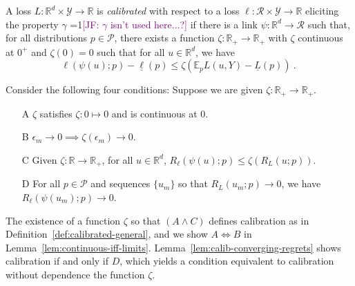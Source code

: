 \documentclass[anon,12pt]{colt2021} %
\newcommand{\Comments}{1}
\newcommand{\mynote}[2]{\ifnum\Comments=1\textcolor{#1}{#2}\fi}
\newcommand{\jessie}[1]{\mynote{purple}{[JF: #1]}}
\newcommand{\reals}{\mathbb{R}}
\newcommand{\E}{\mathbb{E}}
\newcommand{\R}{\mathcal{R}}
\renewcommand{\P}{\mathcal{P}}
\newcommand{\Y}{\mathcal{Y}}
\newcommand{\exploss}[3]{\E_{#3} #1(#2,Y)}
\newcommand{\risk}[1]{\underline{#1}}
\begin{document}
\begin{definition}[Calibrated]\label{def:calibrated-general}
	A loss $L:\reals^d \times \Y \to \reals$ is \emph{calibrated} with respect to a loss $\ell : \R \times \Y \to \reals$ eliciting the property $\gamma$ \jessie{$\gamma$ isn't used here...?} if there is a link $\psi : \reals^d \to \R$ such that, for all distributions $p \in \P$, there exists a function $\zeta : \reals_+ \to \reals_+$ with $\zeta$ continuous at $0^+$ and $\zeta(0) = 0$ such that for all $u \in \reals^d$, we have
	\begin{equation}\label{eq:calibrated-general}
	\ell( \psi(u); p) - \risk{\ell}(p)  \leq \zeta \left(  \exploss{L}{u}{p} - \risk{L}(p) \right)~.~
	\end{equation}
\end{definition}

Consider the following four conditions: Suppose we are given $\zeta:\reals_+ \to \reals_+$.
\begin{enumerate}
	\item [A] $\zeta$ satisfies $\zeta : 0 \mapsto 0$ and is continuous at $0$.
	\item [B] $\epsilon_m \to 0 \implies \zeta(\epsilon_m) \to 0$.
	\item [C] Given $\zeta:\reals \to \reals_+$, for all $u \in \reals^d$, $R_\ell(\psi(u); p) \leq \zeta(R_L(u;p))$.
	\item [D] For all $p \in \P$ and sequences $\{u_m\}$ so that $R_L(u_m; p) \to 0$, we have $R_\ell(\psi(u_m); p) \to 0$.
\end{enumerate}
The existence of a function $\zeta$ so that $(A \wedge C)$ defines calibration as in Definition~\ref{def:calibrated-general}, and we show $A \iff B$ in Lemma~\ref{lem:continuous-iff-limits}.  
Lemma~\ref{lem:calib-converging-regrets} shows calibration if and only if $D$, which yields a condition equivalent to calibration without dependence the function $\zeta$.
\end{document}

